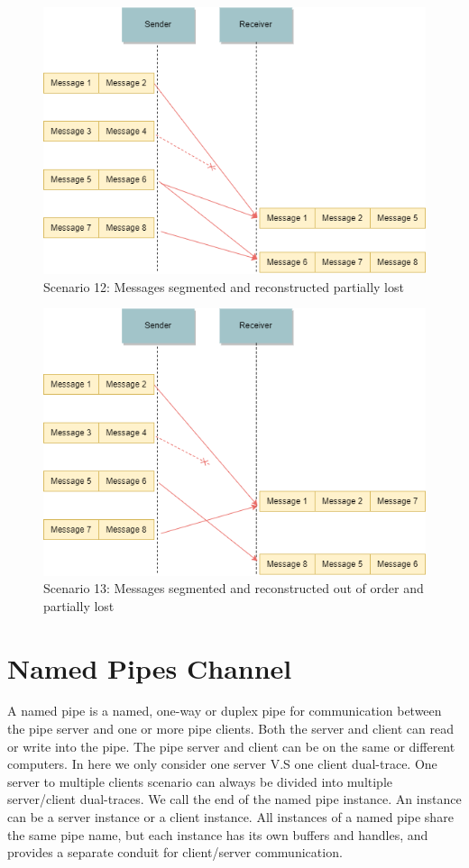 \begin{figure}[ht!]
\centerline{\includegraphics[scale=0.6]{Figures/scenario12}}
 \caption{Scenario 12: Messages segmented and reconstructed partially lost}
\label{scenario12}
\end{figure}
\clearpage
\begin{figure}[ht!]
\centerline{\includegraphics[scale=0.6]{Figures/scenario13}}
 \caption{Scenario 13: Messages segmented and reconstructed out of order and partially lost}
\label{scenario13}
\end{figure}

\section{Named Pipes Channel}
A named pipe is a named, one-way or duplex pipe for communication between the pipe server and one or more pipe clients. Both the server and client can read or write into the pipe. The pipe server and client can be on the same or different computers.  In here we only consider one server V.S one client dual-trace. One server to multiple clients scenario can always be divided into multiple server/client dual-traces. We call the end of the named pipe instance. An instance can be a server instance or a client instance. All instances of a named pipe share the same pipe name, but each instance has its own buffers and handles, and provides a separate conduit for client/server communication. 

